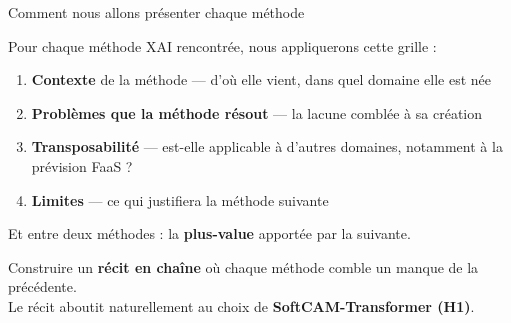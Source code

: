 \documentclass[10pt]{beamer}
\begin{document}
\begin{frame}{Comment nous allons présenter chaque méthode}
  \begin{tcolorbox}[colback=newcontrib!5, colframe=newcontrib!70!black, arc=3mm,
                    fonttitle=\bfseries, title=Canevas en 4 points (uniforme pour toutes les méthodes)]
    Pour chaque méthode XAI rencontrée, nous appliquerons cette grille :
    \begin{enumerate}
      \item \textbf{Contexte} de la méthode --- d'où elle vient, dans quel domaine elle est née
      \item \textbf{Problèmes que la méthode résout} --- la lacune comblée à sa création
      \item \textbf{Transposabilité} --- est-elle applicable à d'autres domaines, notamment à la prévision FaaS ?
      \item \textbf{Limites} --- ce qui justifiera la méthode suivante
    \end{enumerate}
    \vspace{2pt}
    Et entre deux méthodes : la \textbf{plus-value} apportée par la suivante.
  \end{tcolorbox}

  \vspace{6pt}

  \begin{tcolorbox}[colback=blue!3, colframe=blue!50!black, arc=2mm,
                    fonttitle=\bfseries, title=Pourquoi ce cadre ?]
    Construire un \textbf{récit en chaîne} où chaque méthode comble un manque de la précédente.\\
    Le récit aboutit naturellement au choix de \textbf{SoftCAM-Transformer (H1)}.
  \end{tcolorbox}
\end{frame}
\end{document}
